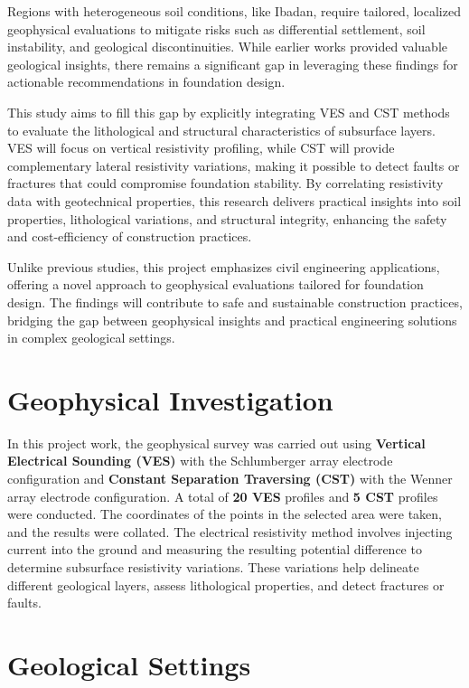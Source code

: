 \documentclass[12pt,a4paper]{report}
\begin{document}
Regions with heterogeneous soil conditions, like Ibadan, require tailored, localized geophysical evaluations to mitigate risks such as differential settlement, soil instability, and geological discontinuities. While earlier works provided valuable geological insights, there remains a significant gap in leveraging these findings for actionable recommendations in foundation design.

This study aims to fill this gap by explicitly integrating VES and CST methods to evaluate the lithological and structural characteristics of subsurface layers. VES will focus on vertical resistivity profiling, while CST will provide complementary lateral resistivity variations, making it possible to detect faults or fractures that could compromise foundation stability. By correlating resistivity data with geotechnical properties, this research delivers practical insights into soil properties, lithological variations, and structural integrity, enhancing the safety and cost-efficiency of construction practices.

Unlike previous studies, this project emphasizes civil engineering applications, offering a novel approach to geophysical evaluations tailored for foundation design. The findings will contribute to safe and sustainable construction practices, bridging the gap between geophysical insights and practical engineering solutions in complex geological settings.

\section{Geophysical Investigation}
In this project work, the geophysical survey was carried out using \textbf{Vertical Electrical Sounding (VES)} with the Schlumberger array electrode configuration and \textbf{Constant Separation Traversing (CST)} with the Wenner array electrode configuration. A total of \textbf{20 VES} profiles and \textbf{5 CST} profiles were conducted. The coordinates of the points in the selected area were taken, and the results were collated. The electrical resistivity method involves injecting current into the ground and measuring the resulting potential difference to determine subsurface resistivity variations. These variations help delineate different geological layers, assess lithological properties, and detect fractures or faults.

\section{Geological Settings}
\end{document}
